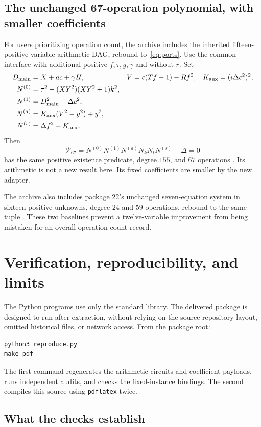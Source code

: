 \documentclass[11pt,a4paper]{article}
\theoremstyle{remark}\newtheorem{remark}[theorem]{Remark}
\begin{document}
\subsection{The unchanged 67-operation polynomial, with smaller coefficients}

For users prioritizing operation count, the archive includes the inherited
fifteen-positive-variable arithmetic DAG, rebound to~\eqref{eq:ports}.
Use the common interface with additional positive $f,\tau,y,\gamma$ and
without $r$. Set
\begin{align*}
 D_{\rm main}&=X+ac+\gamma H,&
 V&=c(Tf-1)-Rf^2,&K_{\rm aux}&=(i\Delta c^2)^2,\\
 N^{(0)}&=\tau^2-(XY^2)(XY^2+1)k^2,\\
 N^{(1)}&=D_{\rm main}^2-\Delta c^2,\\
 N^{(a)}&=K_{\rm aux}(V^2-y^2)+y^2,\\
 N^{(s)}&=\Delta f^2-K_{\rm aux}.
\end{align*}
Then
\[
 \mathcal P_{67}=N^{(0)}N^{(1)}N^{(a)}N_kN_tN^{(s)}-\Delta=0
\]
has the same positive existence predicate, degree $155$, and $67$
operations \cite{blank67}. Its arithmetic is not a new result here.
Its fixed coefficients are smaller by the new adapter.

The archive also includes package 22's unchanged seven-equation system
in sixteen positive unknowns, degree $24$ and $59$ operations, rebound
to the same tuple \cite{retained59}. These two baselines prevent a
twelve-variable improvement from being mistaken for an overall
operation-count record.

\section{Verification, reproducibility, and limits}
\label{sec:verification}

The Python programs use only the standard library. The delivered package
is designed to run after extraction, without relying on the source
repository layout, omitted historical files, or network access.
From the package root:
\begin{verbatim}
python3 reproduce.py
make pdf
\end{verbatim}
The first command regenerates the arithmetic circuits and coefficient
payloads, runs independent audits, and checks the fixed-instance bindings.
The second compiles this source using \texttt{pdflatex} twice.

\subsection{What the checks establish}
\end{document}
